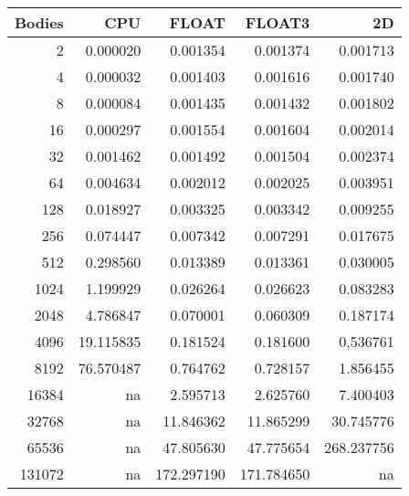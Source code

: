 \documentclass[a4paper]{article}
\begin{document}
\begin{table}[H]
\centering
\footnotesize
\begin{tabular}{|r|r|r|r|r|}
\textbf{Bodies} & \textbf{CPU} & \textbf{FLOAT} & \textbf{FLOAT3} & \textbf{2D} \\ \hline
2      & 0.000020  &   0.001354 &   0.001374 &   0.001713 \\ \hline
4      & 0.000032  &   0.001403 &   0.001616 &   0.001740 \\ \hline
8      & 0.000084  &   0.001435 &   0.001432 &   0.001802 \\ \hline
16     & 0.000297  &   0.001554 &   0.001604 &   0.002014 \\ \hline
32     & 0.001462  &   0.001492 &   0.001504 &   0.002374 \\ \hline
64     & 0.004634  &   0.002012 &   0.002025 &   0.003951 \\ \hline
128    & 0.018927  &   0.003325 &   0.003342 &   0.009255 \\ \hline
256    & 0.074447  &   0.007342 &   0.007291 &   0.017675 \\ \hline
512    & 0.298560  &   0.013389 &   0.013361 &   0.030005 \\ \hline
1024   & 1.199929  &   0.026264 &   0.026623 &   0.083283 \\ \hline
2048   & 4.786847  &   0.070001 &   0.060309 &   0.187174 \\ \hline
4096   & 19.115835 &   0.181524 &   0.181600 &   0,536761 \\ \hline
8192   & 76.570487 &   0.764762 &   0.728157 &   1.856455 \\ \hline
16384  & na        &   2.595713 &   2.625760 &   7.400403 \\ \hline
32768  & na        &  11.846362 &  11.865299 &  30.745776 \\ \hline
65536  & na        &  47.805630 &  47.775654 & 268.237756 \\ \hline
131072 & na        & 172.297190 & 171.784650 & na         \\ \hline
\end{tabular}
\end{table}

\begin{figure}[H]
\end{figure}
\end{document}

